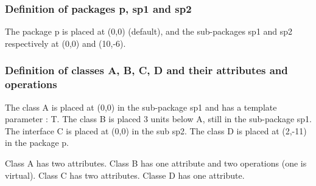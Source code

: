 \documentclass[a4paper,11pt]{report}
\newcommand{\inputTikZ}[1]{%
  }%
\newcommand{\inputTikZ}[1]{%
    \texttt{[image: fig/\#1.pdf]}%
  }%
\begin{document}
\subsubsection{Definition of packages p, sp1 and sp2}

The package p is placed at (0,0) (default), and the sub-packages sp1 and sp2 respectively at (0,0) and (10,-6).

{\color{red!70!black}
\vspace{-0.4cm}
\vspace{-0.4cm}
\vspace{-0.4cm}

}

\begin{center}
\inputTikZ{classdiagstep1}
\end{center}

\subsubsection{Definition of classes A, B, C, D and their attributes and operations}

The class A is placed at (0,0) in the sub-package sp1 and has a template parameter : T. The class B is placed 3 units below A, still in the sub-package sp1. The interface C is placed at (0,0) in the sub sp2. 
The class D is placed at (2,-11) in the package p.

Class A has two attributes. Class B has one attribute and two operations (one is virtual). Class C has two attributes. Classe D has one attribute.

\vspace{-0.4cm}
{\color{red!70!black}
\vspace{-0.4cm}
}
\vspace{-0.4cm}
{\color{red!70!black}
\vspace{-0.4cm}
}
\vspace{-0.4cm}
{\color{red!70!black}
\vspace{-0.4cm}
}

\end{document}

